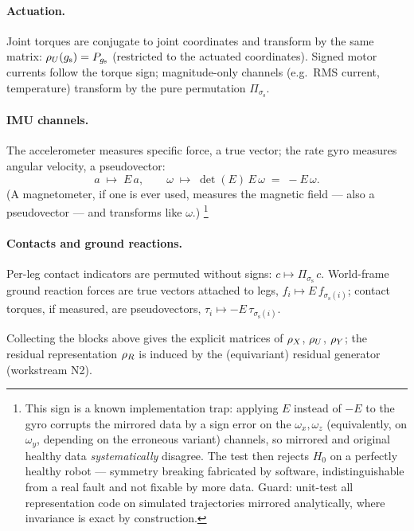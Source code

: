 \paragraph{Actuation.}
Joint torques are conjugate to joint coordinates and transform by the same
matrix: $\rho_{U}(g_{\mathrm{s}}) = P_{g_{\mathrm{s}}}$ (restricted to the actuated coordinates).
Signed motor currents follow the torque sign; magnitude-only channels
(e.g.\ RMS current, temperature) transform by the pure permutation
$\Pi_{\sigma_{\mathrm{s}}}$.

\paragraph{IMU channels.}
The accelerometer measures specific force, a true vector; the rate gyro
measures angular velocity, a pseudovector:
\begin{equation}
  \label{eq:imu-action}
  a \;\longmapsto\; E\,a,
  \qquad
  \omega \;\longmapsto\; \det(E)\,E\,\omega \;=\; -E\,\omega .
\end{equation}
(A magnetometer, if one is ever used, measures the magnetic field --- also a
pseudovector --- and transforms like $\omega$.)%
\footnote{This sign is a known implementation trap: applying $E$ instead of
$-E$ to the gyro corrupts the mirrored data by a sign error on the
$\omega_x,\omega_z$ (equivalently, on $\omega_y$, depending on the erroneous
variant) channels, so mirrored and original healthy data \emph{systematically}
disagree. The test then rejects $H_0$ on a perfectly healthy robot ---
symmetry breaking fabricated by software, indistinguishable from a real fault
and not fixable by more data. Guard: unit-test all representation code on
simulated trajectories mirrored analytically, where invariance is exact by
construction.}

\paragraph{Contacts and ground reactions.}
Per-leg contact indicators are permuted without signs:
$c \mapsto \Pi_{\sigma_{\mathrm{s}}}\, c$. World-frame ground reaction forces
are true vectors attached to legs, $f_i \mapsto E\, f_{\sigma_{\mathrm{s}}(i)}$;
contact torques, if measured, are pseudovectors,
$\tau_i \mapsto -E\, \tau_{\sigma_{\mathrm{s}}(i)}$.

Collecting the blocks above gives the explicit matrices of
$\rho_{X}$, $\rho_{U}$, $\rho_{Y}$; the residual representation $\rho_{R}$ is induced by
the (equivariant) residual generator (workstream N2).

